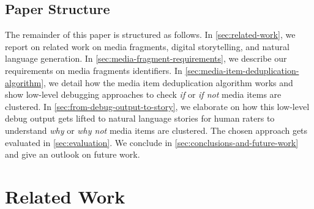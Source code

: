 \documentclass{article}
\begin{document}
\subsection{Paper Structure}
\label{sec:paper-structure}

The remainder of this paper is structured as follows.
In \autoref{sec:related-work}, we report on related work
on media fragments, digital storytelling, and natural language generation.
In \autoref{sec:media-fragment-requirements}, we describe
our requirements on media fragments identifiers.
In \autoref{sec:media-item-deduplication-algorithm},
we detail how the media item deduplication algorithm works
and show low-level debugging approaches to check
\emph{if} or \emph{if not} media items are clustered.
In \autoref{sec:from-debug-output-to-story},
we elaborate on how this low-level debug output gets lifted
to natural language stories for human raters to understand
\emph{why} or \emph{why not} media items are clustered.
The chosen approach gets evaluated in \autoref{sec:evaluation}.
We conclude in \autoref{sec:conclusions-and-future-work}
and give an outlook on future work.

\section{Related Work}
\label{sec:related-work}
\end{document}
